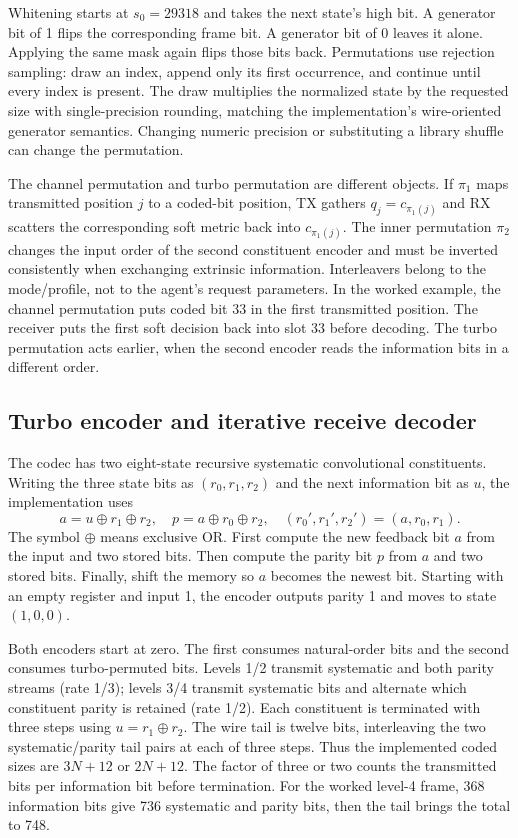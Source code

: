 Whitening starts at $s_0=29318$ and takes the next state's high bit. A
generator bit of 1 flips the corresponding frame bit. A generator bit
of 0 leaves it alone. Applying the same mask again flips those bits
back. Permutations use
rejection sampling: draw an index, append only its first occurrence, and
continue until every index is present. The draw multiplies the normalized
state by the requested size with single-precision rounding, matching the
implementation's wire-oriented generator semantics. Changing numeric precision
or substituting a library shuffle can change the permutation.

The channel permutation and turbo permutation are different objects. If
$\pi_1$ maps transmitted position $j$ to a coded-bit position, TX gathers
$q_j=c_{\pi_1(j)}$ and RX scatters the corresponding soft metric back into
$c_{\pi_1(j)}$. The inner permutation $\pi_2$ changes the input order of the
second constituent encoder and must be inverted consistently when exchanging
extrinsic information. Interleavers belong to the mode/profile, not to the
agent's request parameters.
In the worked example, the channel permutation puts coded bit 33 in the
first transmitted position. The receiver puts the first soft decision
back into slot 33 before decoding. The turbo permutation acts earlier,
when the second encoder reads the information bits in a different order.

\subsection{Turbo encoder and iterative receive decoder}
The codec has two eight-state recursive systematic convolutional constituents.
Writing the three state bits as $(r_0,r_1,r_2)$ and the next information bit as
$u$, the implementation uses
\[
 a=u\oplus r_1\oplus r_2,\quad
 p=a\oplus r_0\oplus r_2,\quad
 (r_0',r_1',r_2')=(a,r_0,r_1).
\]
The symbol $\oplus$ means exclusive OR. First compute the new feedback
bit $a$ from the input and two stored bits. Then compute the parity bit
$p$ from $a$ and two stored bits. Finally, shift the memory so $a$
becomes the newest bit. Starting with an empty register and input 1,
the encoder outputs parity 1 and moves to state $(1,0,0)$.

Both encoders start at zero. The first consumes natural-order bits and the
second consumes turbo-permuted bits. Levels 1/2 transmit systematic and both
parity streams (rate 1/3); levels 3/4 transmit systematic bits and alternate
which constituent parity is retained (rate 1/2). Each constituent is terminated
with three steps using $u=r_1\oplus r_2$. The wire tail is twelve bits,
interleaving the two systematic/parity tail pairs at each of three steps.
Thus the implemented coded sizes are $3N+12$ or $2N+12$.
The factor of three or two counts the transmitted bits per information
bit before termination. For the worked level-4 frame, 368 information
bits give 736 systematic and parity bits, then the tail brings the
total to 748.

